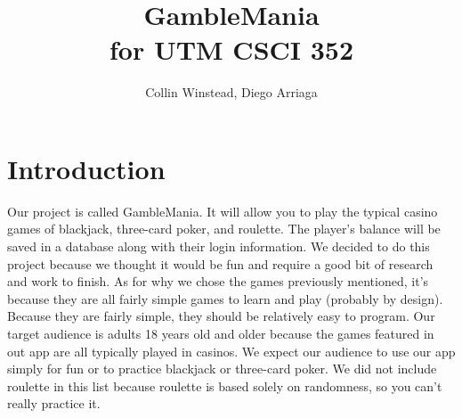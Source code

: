 \documentclass[10pt,conference,onecolumn,compsoc]{IEEEtran}
\begin{document}
\title{GambleMania\\ for UTM CSCI 352}
%
%


\author{Collin Winstead, Diego Arriaga%
}



\maketitle



\IEEEdisplaynontitleabstractindextext

\IEEEpeerreviewmaketitle



\section{Introduction}


Our project is called GambleMania. It will allow you to play the typical casino games of blackjack, three-card poker, and roulette. The player's balance will be saved in a database along with their login information. We decided to do this project because we thought it would be fun and require a good bit of research and work to finish. As for why we chose the games previously mentioned, it's because they are all fairly simple games to learn and play (probably by design). Because they are fairly simple, they should be relatively easy to program. Our target audience is adults 18 years old and older because the games featured in out app are all typically played in casinos. We expect our audience to use our app simply for fun or to practice blackjack or three-card poker. We did not include roulette in this list because roulette is based solely on randomness, so you can't really practice it.
\end{document}
